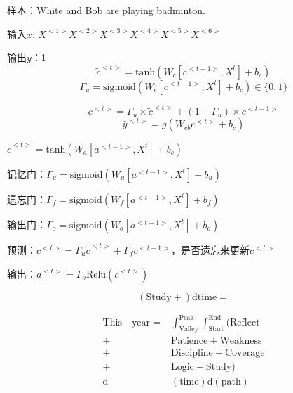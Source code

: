 \documentclass{ctexart}
\begin{document}
	样本：White and Bob are playing badminton.
	
	输入$x$: $X^{<1>}$$X^{<2>}$$X^{<3>}$$X^{<4>}$$X^{<5>}$$X^{<6>}$
	
	输出$y$：1
	$$\tilde{c}^{<t>}=\mathrm{tanh}(W_c[c^{<t-1>},X^{t}]+b_c)$$
	$$\Gamma_u=\mathrm{sigmoid}(W_c[c^{<t-1>},X^{t}]+b_c)\in\{0,1\}$$
	
	$${c}^{<t>}=\Gamma_u\times \tilde{c}^{<t>}+(1-\Gamma_u)\times {c}^{<t-1>}$$
	$$\hat{y}^{<t>}=g(W_{cb}{c}^{<t>}+b_{c})$$
	
	
	$\tilde{c}^{<t>}=\mathrm{tanh}(W_a[a^{<t-1>},X^{t}]+b_c)$
	
	记忆门：$\Gamma_u=\mathrm{sigmoid}(W_u[a^{<t-1>},X^{t}]+b_u)$	
	
	遗忘门：$\Gamma_f=\mathrm{sigmoid}(W_f[a^{<t-1>},X^{t}]+b_f)$
	
	输出门：$\Gamma_o=\mathrm{sigmoid}(W_o[a^{<t-1>},X^{t}]+b_o)$
	
	预测：$c^{<t>}=\Gamma_u\tilde{c}^{<t>}+\Gamma_f {c}^{<t-1>}$，是否遗忘来更新$c^{<t>}$
	
	输出：$a^{<t>}=\Gamma_o\mathrm{Relu}(c^{<t>})$
	
	
	$$(\mathrm{Study}+)\mathrm{d time}=$$
	
	
	\begin{align}
	\mathrm{This\quad\! year} ={} & \int_{\mathrm{Valley}}^{\mathrm{Peak}}\int_{\mathrm{Start}}^{\mathrm{End}}(\mathrm{Reflect} \\
	+{} & \mathrm{Patience}+\mathrm{Weakness}\\
	+{} & \mathrm{Discipline}+\mathrm{Coverage}\\
	+{} &\mathrm{Logic}+\mathrm{Study})\\
	\mathrm{d}&\mathrm{(time)}\mathrm{d}\mathrm{(path)}
	\end{align}
	

	
\end{document}
